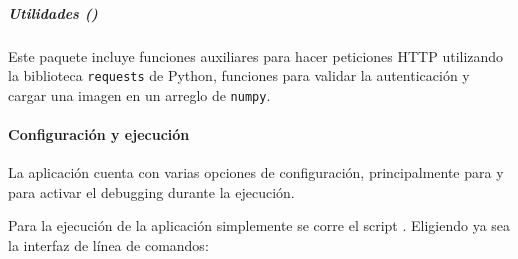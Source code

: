 \begin{sphinxVerbatim}[commandchars=\\\{\}]
   
  
\end{sphinxVerbatim}


\subparagraph{Utilidades ()}
\label{\detokenize{chapter_two/desc_cloudnao:utilidades-utils}}

Este paquete incluye funciones auxiliares
para hacer peticiones HTTP utilizando la biblioteca 
\texttt{requests} de Python, funciones para validar
la autenticación y cargar una imagen en un arreglo
de \texttt{numpy}.


\paragraph{Configuración y ejecución}
\label{\detokenize{chapter_two/desc_cloudnao:configuracion-y-ejecucion}}
La aplicación cuenta con varias opciones de configuración, principalmente
para  y para activar el debugging durante la ejecución.

Para la ejecución de la aplicación simplemente se corre el
script . Eligiendo ya sea la interfaz de línea de comandos:


